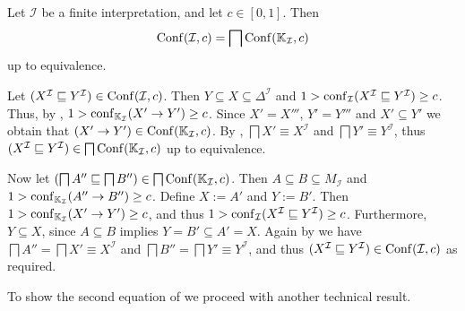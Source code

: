 \begin{Corollary}
  \label{cor:Conf-from-K_I}
  Let $\mathcal{I}$ be a finite interpretation, and let $c \in [0,1]$.  Then
  \begin{equation*}
    \operatorname{Conf}(\mathcal{I}, c) = \bigsqcap \operatorname{Conf}({\mathbb{K}}_{\mathcal{I}}, c)
  \end{equation*}
  up to equivalence.
\end{Corollary}
\begin{Proof}
  Let $(X^{\mathcal{I}} \sqsubseteq Y^{\mathcal{I}}) \in \operatorname{Conf}(\mathcal{I}, c)$.  Then $Y
  \subseteq X \subseteq \Delta^{\mathcal{I}}$ and $1 > \operatorname{conf}_{\mathcal{I}}(X^{\mathcal{I}}
  \sqsubseteq Y^{\mathcal{I}}) \ge c$.  Thus, by
  , $1 > \operatorname{conf}_{{\mathbb{K}}_{\mathcal{I}}}(X'
  \to Y') \ge c$.  Since $X' = X'''$, $Y' = Y'''$ and $X' \subseteq Y'$ we obtain that
  $(X' \to Y') \in \operatorname{Conf}({\mathbb{K}}_{\mathcal{I}}, c)$.  By
  , $\bigsqcap X' \equiv X^{\mathcal{I}}$ and
  $\bigsqcap Y' \equiv Y^{\mathcal{I}}$, thus $(X^{\mathcal{I}} \sqsubseteq
  Y^{\mathcal{I}}) \in \bigsqcap \operatorname{Conf}({\mathbb{K}}_{\mathcal{I}}, c)$ up to equivalence.

  Now let $(\bigsqcap A'' \sqsubseteq \bigsqcap B'') \in \bigsqcap \operatorname{Conf}({\mathbb{K}}_{\mathcal{I}}, c)$.  Then $A \subseteq B \subseteq M_{\mathcal{I}}$ and $1 >
  \operatorname{conf}_{{\mathbb{K}}_{\mathcal{I}}}(A'' \to B'') \ge c$.  Define $X := A'$ and $Y := B'$.  Then
  $1 > \operatorname{conf}_{{\mathbb{K}}_{\mathcal{I}}}(X' \to Y') \ge c$, and thus $1 >
  \operatorname{conf}_{\mathcal{I}}(X^{\mathcal{I}} \sqsubseteq Y^{\mathcal{I}}) \ge c$.  Furthermore,
  $Y \subseteq X$, since $A \subseteq B$ implies $Y = B' \subseteq A' = X$.  Again by
   we have $\bigsqcap A'' = \bigsqcap X' \equiv
  X^{\mathcal{I}}$ and $\bigsqcap B'' = \bigsqcap Y' \equiv Y^{\mathcal{I}}$, and thus
  $(X^{\mathcal{I}} \sqsubseteq Y^{\mathcal{I}}) \in \operatorname{Conf}(\mathcal{I}, c)$ as required.
\end{Proof}

To show the second equation of  we proceed with another technical result.

